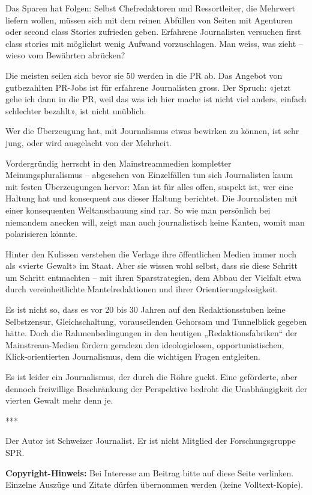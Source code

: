 Das Sparen hat Folgen: Selbst Chefredaktoren und Ressortleiter, die
Mehrwert liefern wollen, müssen sich mit dem reinen Abfüllen von Seiten
mit Agenturen oder second class Stories zufrieden geben. Erfahrene
Journalisten versuchen first class stories mit möglichst wenig Aufwand
vorzuschlagen. Man weiss, was zieht -- wieso vom Bewährten abrücken?

Die meisten seilen sich bevor sie 50 werden in die PR ab. Das Angebot
von gutbezahlten PR-Jobs ist für erfahrene Journalisten gross. Der
Spruch: «jetzt gehe ich dann in die PR, weil das was ich hier mache ist
nicht viel anders, einfach schlechter bezahlt», ist nicht unüblich.

Wer die Überzeugung hat, mit Journalismus etwas bewirken zu können, ist
sehr jung, oder wird ausgelacht von der Mehrheit.

Vordergründig herrscht in den Mainstreammedien kompletter
Meinungspluralismus -- abgesehen von Einzelfällen tun sich Journalisten
kaum mit festen Überzeugungen hervor: Man ist für alles offen, suspekt
ist, wer eine Haltung hat und konsequent aus dieser Haltung berichtet.
Die Journalisten mit einer konsequenten Weltanschauung sind rar. So wie
man persönlich bei niemandem anecken will, zeigt man auch journalistisch
keine Kanten, womit man polarisieren könnte.

Hinter den Kulissen verstehen die Verlage ihre öffentlichen Medien immer
noch als «vierte Gewalt» im Staat. Aber sie wissen wohl selbst, dass sie
diese Schritt um Schritt entmachten -- mit ihren Sparstrategien, dem
Abbau der Vielfalt etwa durch vereinheitlichte Mantelredaktionen und
ihrer Orientierungslosigkeit.

Es ist nicht so, dass es vor 20 bis 30 Jahren auf den Redaktionsstuben
keine Selbstzensur, Gleich­schaltung, vorauseilenden Gehorsam und
Tunnelblick gegeben hätte. Doch die Rahmen­bedingungen in den heutigen
„Redaktions­fabriken`` der Mainstream-Medien fördern geradezu den
ideologielosen, opportunistischen, Klick-orientierten Journalismus, dem
die wichtigen Fragen entgleiten.

Es ist leider ein Journalismus, der durch die Röhre guckt. Eine
geförderte, aber dennoch freiwillige Beschränkung der Perspektive
bedroht die Unabhängigkeit der vierten Gewalt mehr denn je.

***

Der Autor ist Schweizer Journalist. Er ist nicht Mitglied der
Forschungsgruppe SPR.

\textbf{Copyright-Hinweis:} Bei Interesse am Beitrag bitte auf diese
Seite verlinken. Einzelne Auszüge und Zitate dürfen übernommen werden
(keine Volltext-Kopie).

